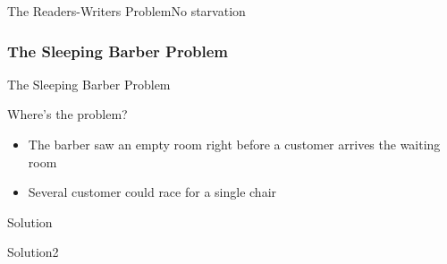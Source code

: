 \begin{frame}{The Readers-Writers Problem}{No starvation}
  \centering
\end{frame}

\subsubsection{The Sleeping Barber Problem}
\label{sec:sleep-barb-probl}

\begin{frame}{The Sleeping Barber Problem}
  \begin{minipage}[m]{.35\linewidth}
  \end{minipage}\quad
  \begin{minipage}[m]{.6\linewidth}
    \begin{block}{Where's the problem?}
      \begin{itemize}
      \item The barber saw an empty room right before a customer arrives the waiting room
      \item Several customer could race for a single chair
      \end{itemize}
    \end{block}
  \end{minipage}
\end{frame}

\begin{frame}{Solution}
  \centering
\end{frame}

\begin{frame}{Solution2}
  \centering
\end{frame}

\begin{frame}
  \begin{refsection}
    \nocite{wiki:ipc, wiki:semaphore}
    \printbibliography[heading=none]
  \end{refsection}
\end{frame}

